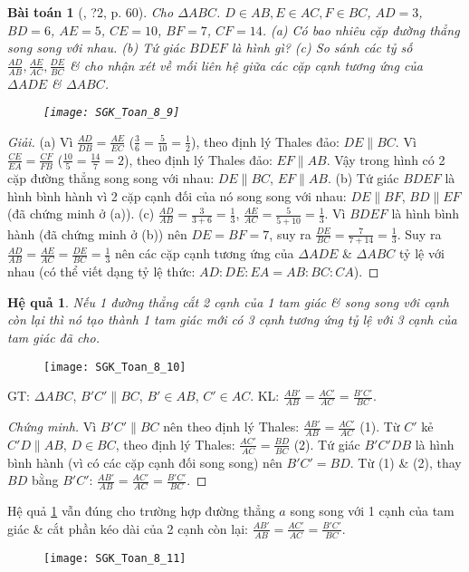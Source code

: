 \documentclass{article}
\newtheorem{baitoan}{Bài toán}
\newtheorem{hequa}{Hệ quả}
\begin{document}
\begin{baitoan}[\cite{SGK_Toan_8_tap_2}, ?2, p. 60]
	Cho $\Delta ABC$. $D\in AB,E\in AC,F\in BC$, $AD = 3$, $BD = 6$, $AE = 5$, $CE = 10$, $BF = 7$, $CF = 14$. (a) Có bao nhiêu cặp đường thẳng song song với nhau. (b) Tứ giác $BDEF$ là hình gì? (c) So sánh các tỷ số $\frac{AD}{AB},\frac{AE}{AC},\frac{DE}{BC}$ \& cho nhận xét về mối liên hệ giữa các cặp cạnh tương ứng của $\Delta ADE$ \& $\Delta ABC$.
	\begin{figure}[H]
		\centering
		\texttt{[image: SGK\_Toan\_8\_9]}
	\end{figure}
\end{baitoan}

\begin{proof}[Giải]	
	(a) Vì $\frac{AD}{DB} = \frac{AE}{EC}$ ($\frac{3}{6} = \frac{5}{10} = \frac{1}{2}$), theo định lý Thales đảo: $DE\parallel BC$. Vì $\frac{CE}{EA} = \frac{CF}{FB}$ ($\frac{10}{5} = \frac{14}{7} = 2$), theo định lý Thales đảo: $EF\parallel AB$. Vậy trong hình có 2 cặp đường thẳng song song với nhau: $DE\parallel BC$, $EF\parallel AB$. (b) Tứ giác $BDEF$ là hình bình hành vì 2 cặp cạnh đối của nó song song với nhau: $DE\parallel BF$, $BD\parallel EF$ (đã chứng minh ở (a)). (c) $\frac{AD}{AB} = \frac{3}{3 + 6} = \frac{1}{3}$, $\frac{AE}{AC} = \frac{5}{5 + 10} = \frac{1}{3}$. Vì $BDEF$ là hình bình hành (đã chứng minh ở (b)) nên $DE = BF = 7$, suy ra $\frac{DE}{BC} = \frac{7}{7 + 14} = \frac{1}{3}$. Suy ra $\frac{AD}{AB} = \frac{AE}{AC} = \frac{DE}{BC} = \frac{1}{3}$ nên các cặp cạnh tương ứng của $\Delta ADE$ \& $\Delta ABC$ tỷ lệ với nhau (có thể viết dạng tỷ lệ thức: $AD:DE:EA = AB:BC:CA$).
\end{proof}

\begin{hequa}
	\label{col: Thales}
	Nếu 1 đường thẳng cắt 2 cạnh của 1 tam giác \& song song với cạnh còn lại thì nó tạo thành 1 tam giác mới có 3 cạnh tương ứng tỷ lệ với 3 cạnh của tam giác đã cho.
\end{hequa}
\begin{figure}[H]
	\centering
	\texttt{[image: SGK\_Toan\_8\_10]}
\end{figure}
GT: $\Delta ABC$, $B'C'\parallel BC$, $B'\in AB$, $C'\in AC$. KL: $\frac{AB'}{AB} = \frac{AC'}{AC} = \frac{B'C'}{BC}$.

\begin{proof}[Chứng minh]
	Vì $B'C'\parallel BC$ nên theo định lý Thales: $\frac{AB'}{AB} = \frac{AC'}{AC}$ (1). Từ $C'$ kẻ $C'D\parallel AB$, $D\in BC$, theo định lý Thales: $\frac{AC'}{AC} = \frac{BD}{BC}$ (2). Tứ giác $B'C'DB$ là hình bình hành (vì có các cặp cạnh đối song song) nên $B'C' = BD$. Từ (1) \& (2), thay $BD$ bằng $B'C'$: $\frac{AB'}{AB} = \frac{AC'}{AC} = \frac{B'C'}{BC}$.
\end{proof}
Hệ quả \ref{col: Thales} vẫn đúng cho trường hợp đường thẳng $a$ song song với 1 cạnh của tam giác \& cắt phần kéo dài của 2 cạnh còn lại: $\frac{AB'}{AB} = \frac{AC'}{AC} = \frac{B'C'}{BC}$.
\begin{figure}[H]
	\centering
	\texttt{[image: SGK\_Toan\_8\_11]}
\end{figure}
\end{document}

